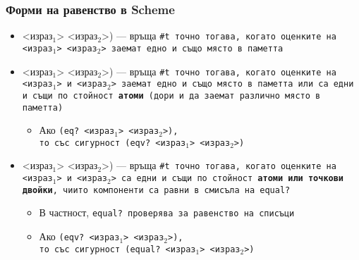 \documentclass{beamer}
\begin{document}
\begin{frame}
  \frametitle{Форми на равенство в Scheme}

  \begin{itemize}[<+->]
  \item {}<израз$_1$> <израз$_2$>\tta) --- връща \tt{\#t} точно тогава, когато оценките на <израз$_1$> <израз$_2$> заемат едно и също място в паметта
  \item {}<израз$_1$> <израз$_2$>\tta) --- връща \tt{\#t} точно тогава, когато оценките на <израз$_1$> и <израз$_2$> заемат едно и също място в паметта или са едни и същи по стойност \textbf{атоми} (дори и да заемат различно място в паметта)
    \begin{itemize}
    \item Ако \tt{(eq? }<израз$_1$> <израз$_2$>\tt),\\
      то със сигурност \tt{(eqv? }<израз$_1$> <израз$_2$>\tt)
    \end{itemize}
  \item {}<израз$_1$> <израз$_2$>\tta) --- връща \tt{\#t} точно тогава, когато оценките на <израз$_1$> и <израз$_2$> са едни и същи по стойност \textbf{атоми или точкови двойки}, чиито компоненти са равни в смисъла на \tt{equal?}
    \begin{itemize}
    \item В частност, \tt{equal?} проверява за равенство на списъци
    \item Ако \tt{(eqv? }<израз$_1$> <израз$_2$>\tt),\\
      то със сигурност \tt{(equal? }<израз$_1$> <израз$_2$>\tt)
    \end{itemize}
  \end{itemize}
\end{frame}
\end{document}
